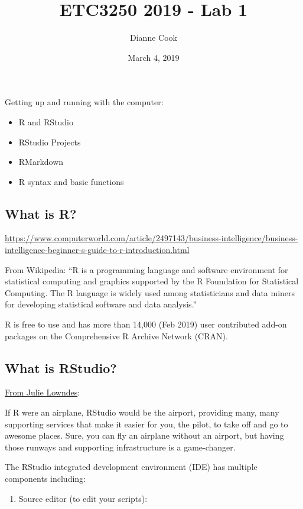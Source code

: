 \documentclass[]{article}
\title{ETC3250 2019 - Lab 1}
\author{Dianne Cook}
\date{March 4, 2019}
\providecommand{\tightlist}{%
  \setlength{\itemsep}{0pt}\setlength{\parskip}{0pt}}
\begin{document}
\maketitle

Getting up and running with the computer:

\begin{itemize}
\tightlist
\item
  R and RStudio
\item
  RStudio Projects
\item
  RMarkdown
\item
  R syntax and basic functions
\end{itemize}

\hypertarget{what-is-r}{%
\subsection{What is R?}\label{what-is-r}}

\url{https://www.computerworld.com/article/2497143/business-intelligence/business-intelligence-beginner-s-guide-to-r-introduction.html}

From Wikipedia: ``R is a programming language and software environment
for statistical computing and graphics supported by the R Foundation for
Statistical Computing. The R language is widely used among statisticians
and data miners for developing statistical software and data analysis.''

R is free to use and has more than 14,000 (Feb 2019) user contributed
add-on packages on the Comprehensive R Archive Network (CRAN).

\hypertarget{what-is-rstudio}{%
\subsection{What is RStudio?}\label{what-is-rstudio}}

\href{http://jules32.github.io/resources/RStudio_intro/}{From Julie
Lowndes}:

If R were an airplane, RStudio would be the airport, providing many,
many supporting services that make it easier for you, the pilot, to take
off and go to awesome places. Sure, you can fly an airplane without an
airport, but having those runways and supporting infrastructure is a
game-changer.

The RStudio integrated development environment (IDE) has multiple
components including:

\begin{enumerate}
\def\labelenumi{\arabic{enumi}.}
\tightlist
\item
  Source editor (to edit your scripts):
\end{enumerate}
\end{document}
